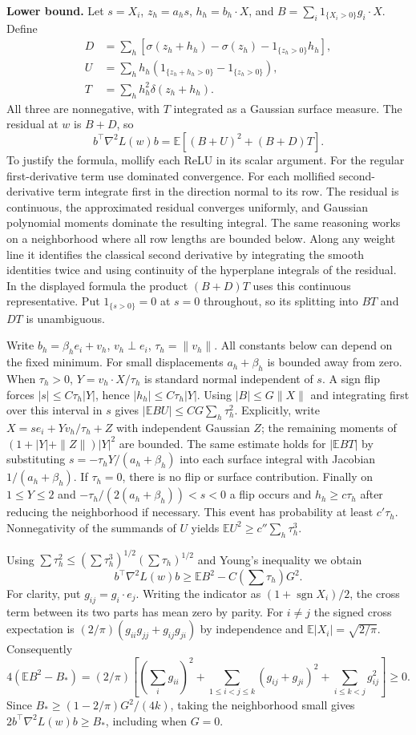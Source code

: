 \documentclass[10pt]{article}
\begin{document}
\textbf{Lower bound.} Let $s=X_i$, $z_h=a_hs$, $h_h=b_h\cdot X$, and $B=\sum_i 1_{\{X_i>0\}}g_i\cdot X$. Define
\begin{align*}
 D&=\sum_h[\sigma(z_h+h_h)-\sigma(z_h)-1_{\{z_h>0\}}h_h],\\
 U&=\sum_h h_h(1_{\{z_h+h_h>0\}}-1_{\{z_h>0\}}),\\
 T&=\sum_h h_h^2\delta(z_h+h_h).
\end{align*}
All three are nonnegative, with $T$ integrated as a Gaussian surface measure. The residual at $w$ is $B+D$, so
\[
 b^\top\nabla^2 L(w)b=\mathbb E[(B+U)^2+(B+D)T].
\]
To justify the formula, mollify each ReLU in its scalar argument. For the regular first-derivative term use dominated convergence. For each mollified second-derivative term integrate first in the direction normal to its row. The residual is continuous, the approximated residual converges uniformly, and Gaussian polynomial moments dominate the resulting integral. The same reasoning works on a neighborhood where all row lengths are bounded below. Along any weight line it identifies the classical second derivative by integrating the smooth identities twice and using continuity of the hyperplane integrals of the residual. In the displayed formula the product $(B+D)T$ uses this continuous representative. Put $1_{\{s>0\}}=0$ at $s=0$ throughout, so its splitting into $BT$ and $DT$ is unambiguous.

Write $b_h=\beta_he_i+v_h$, $v_h\perp e_i$, $\tau_h=\|v_h\|$. All constants below can depend on the fixed minimum. For small displacements $a_h+\beta_h$ is bounded away from zero. When $\tau_h>0$, $Y=v_h\cdot X/\tau_h$ is standard normal independent of $s$. A sign flip forces $|s|\le C\tau_h|Y|$, hence $|h_h|\le C\tau_h|Y|$. Using $|B|\le G\|X\|$ and integrating first over this interval in $s$ gives $|\mathbb E BU|\le CG\sum_h\tau_h^2$. Explicitly, write $X=se_i+Yv_h/\tau_h+Z$ with independent Gaussian $Z$; the remaining moments of $(1+|Y|+\|Z\|)|Y|^2$ are bounded. The same estimate holds for $|\mathbb E BT|$ by substituting $s=-\tau_hY/(a_h+\beta_h)$ into each surface integral with Jacobian $1/(a_h+\beta_h)$. If $\tau_h=0$, there is no flip or surface contribution. Finally on $1\le Y\le2$ and $-\tau_h/(2(a_h+\beta_h))<s<0$ a flip occurs and $h_h\ge c\tau_h$ after reducing the neighborhood if necessary. This event has probability at least $c'\tau_h$. Nonnegativity of the summands of $U$ yields $\mathbb E U^2\ge c''\sum_h\tau_h^3$.

Using $\sum\tau_h^2\le(\sum\tau_h^3)^{1/2}(\sum\tau_h)^{1/2}$ and Young's inequality we obtain
\[
 b^\top\nabla^2 L(w)b\ge \mathbb E B^2-C(\textstyle\sum\tau_h)G^2.
\]
For clarity, put $g_{ij}=g_i\cdot e_j$. Writing the indicator as $(1+\operatorname{sgn}X_i)/2$, the cross term between its two parts has mean zero by parity. For $i\ne j$ the signed cross expectation is $(2/\pi)(g_{ii}g_{jj}+g_{ij}g_{ji})$ by independence and $\mathbb E|X_i|=\sqrt{2/\pi}$. Consequently
\[
 4(\mathbb E B^2-B_*)=(2/\pi)\left[(\sum_i g_{ii})^2+
 \sum_{1\le i<j\le k}(g_{ij}+g_{ji})^2+\sum_{i\le k<j}g_{ij}^2\right]\ge0.
\]
Since $B_*\ge(1-2/\pi)G^2/(4k)$, taking the neighborhood small gives $2b^\top\nabla^2 L(w)b\ge B_*$, including when $G=0$.
\end{document}
